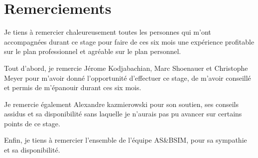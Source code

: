 
\section*{Remerciements}
\bigskip
Je tiens à remercier chaleureusement toutes les personnes qui m'ont accompagnées durant ce stage pour faire de ces six mois une expérience  profitable sur le plan professionnel et agréable sur le plan personnel.


\noindent Tout d'abord, je remercie Jérome Kodjabachian, Marc Shoenauer et Christophe Meyer pour m'avoir donné l'opportunité d'effectuer ce stage, de m'avoir conseillé et  permis de m'épanouir durant ces six mois.


\noindent Je remercie également Alexandre kazmierowski pour son soutien, ses conseils assidus et sa disponibilité sans laquelle je n'aurais pas pu avancer sur certains points de ce stage.   


\noindent Enfin, je tiens à remercier l'ensemble de l'équipe AS&BSIM, pour sa sympathie et sa disponibilité.